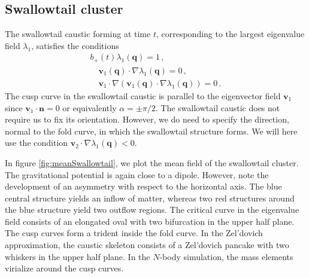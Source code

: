 \documentclass[a4paper, 11pt]{article}
\begin{document}
\subsection{Swallowtail cluster}
The swallowtail caustic forming at time $t$, corresponding to the largest eigenvalue field $\lambda_1$, satisfies the conditions
\begin{align}
b_+(t) \lambda_1(\bm{q}) = 1\,,\\
\quad \bm{v}_1(\bm{q}) \cdot \nabla\lambda_1(\bm{q}) = 0\,,\\
 \quad\bm{v}_1\cdot \nabla( \bm{v}_1(\bm{q}) \cdot \nabla\lambda_1(\bm{q})) = 0\,.
\end{align}
The cusp curve in the swallowtail caustic is parallel to the eigenvector field $\bm{v}_1$ since $\bm{v}_1 \cdot \bm{n}=0$ or equivalently $\alpha = \pm \pi/2$. The swallowtail caustic does not require us to fix its orientation. However, we do need to specify the direction, normal to the fold curve, in which the swallowtail structure forms. We will here use the condition $\bm{v}_2 \cdot \nabla \lambda_1(\bm{q}) <0$.





In figure \ref{fig:meanSwallowtail}, we plot the mean field of the swallowtail cluster. The gravitational potential is again close to a dipole. However, note the development of an asymmetry with respect to the horizontal axis. The blue central structure yields an inflow of matter, whereas two red structures around the blue structure yield two outflow regions. The critical curve in the eigenvalue field consists of an elongated oval with two bifurcation in the upper half plane. The cusp curves form a trident inside the fold curve. In the Zel'dovich approximation, the caustic skeleton consists of a Zel'dovich pancake with two whiskers in the upper half plane. In the $N$-body simulation, the mass elements virialize around the cusp curves.
\end{document}
